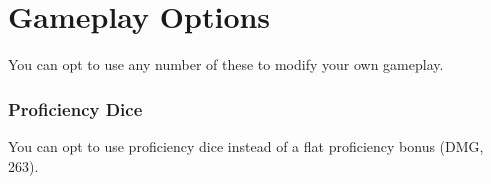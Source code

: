 \documentclass[letterpaper,twocolumn,openany,nodeprecatedcode]{dndbook}
\begin{document}







\chapter{Gameplay Options}
\noindent You can opt to use any number of these to modify your own gameplay.

\subsection{Proficiency Dice}
You can opt to use proficiency dice instead of a flat proficiency bonus (DMG, 263).
\end{document}
